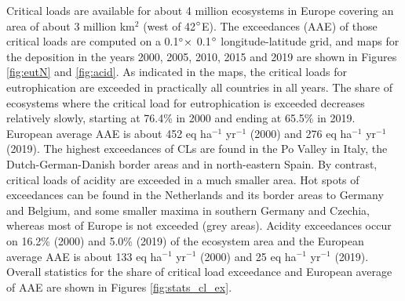 Critical loads are available for about 4 million ecosystems in Europe covering an area
of about 3 million km$^{2}$ (west of 42$^\circ$E). The exceedances (AAE) of those critical loads
are computed on a 0.1$^\circ \times$ 0.1$^\circ$ longitude-latitude grid, and maps for the deposition in
the years 2000, 2005, 2010, 2015 and 2019 are shown in Figures \ref{fig:eutN} and \ref{fig:acid}. As indicated in the maps, the critical loads for eutrophication are exceeded in practically all countries in all years. The share of ecosystems where the critical load for eutrophication is exceeded decreases relatively slowly, starting at 76.4\% in 2000 and ending at 65.5\% in 2019.
European average AAE is about 452 eq ha$^{-1}$ yr$^{-1}$ (2000) and 276 eq
ha$^{-1}$ yr$^{-1}$ (2019). The highest exceedances of CLs are found in the Po Valley in Italy, the
Dutch-German-Danish border areas and in north-eastern Spain.
By contrast, critical loads of acidity are exceeded in a much smaller area. Hot spots of
exceedances can be found in the Netherlands and its border areas to Germany and
Belgium, and some smaller maxima in southern Germany and Czechia,
whereas most of Europe is not exceeded (grey areas). Acidity exceedances occur
on 16.2\% (2000) and 5.0\% (2019) of the ecosystem area and the European average
AAE is about 133 eq ha$^{-1}$ yr$^{-1}$ (2000) and 25 eq ha$^{-1}$ yr$^{-1}$ (2019). Overall statistics for the share of critical load exceedance and European average of AAE are shown in Figures \ref{fig:stats_cl_ex}.
